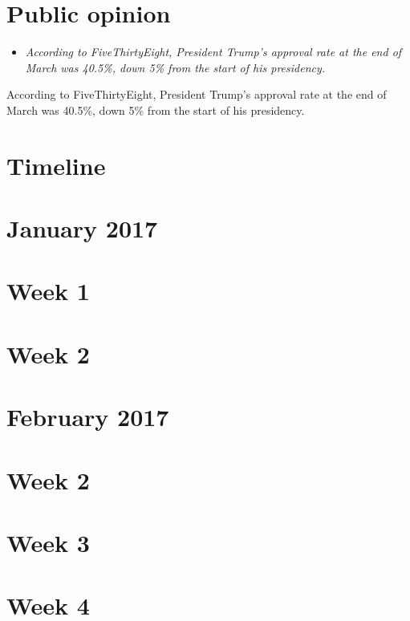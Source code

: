 \section{Public opinion}\label{public-opinion}

\begin{itemize}
\item
  \emph{According to FiveThirtyEight, President Trump's approval rate at
  the end of March was 40.5\%, down 5\% from the start of his
  presidency.}
\end{itemize}

According to FiveThirtyEight, President Trump's approval rate at the end
of March was 40.5\%, down 5\% from the start of his presidency.

\section{Timeline}\label{timeline}

\section{January 2017}\label{january-2017}

\section{Week 1}\label{week-1}

\section{Week 2}\label{week-2}

\section{February 2017}\label{february-2017}

\section{Week 2}\label{week-2-1}

\section{Week 3}\label{week-3}

\section{Week 4}\label{week-4}

